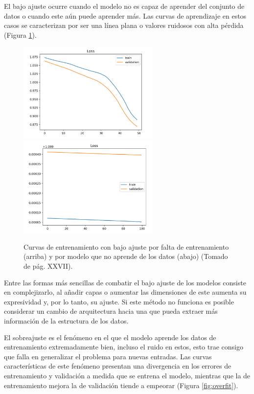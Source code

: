 \documentclass[a4paper,11pt,twocolumn,twoside]{article}
\begin{document}
El bajo ajuste ocurre cuando el modelo no es capaz de aprender del conjunto de datos o cuando este aún puede aprender 
más. Las curvas de aprendizaje en estos casos se caracterizan por ser una línea plana o valores ruidosos con alta pérdida
(Figura \ref{fig:underfit}).

\begin{figure}[h]
	\centering
	\includegraphics[width=7cm,clip]{Graphics/underfit_missing_training.png}
	\includegraphics[width=7cm,clip]{Graphics/underfit_not_learning.png}
	\caption{Curvas de entrenamiento con bajo ajuste por falta de entrenamiento (arriba)
		y por modelo que no aprende de los datos (abajo) (Tomado de \cite{brownlee2018better} pág. XXVII).}
	\label{fig:underfit}
\end{figure}

Entre las formas más sencillas de combatir el bajo ajuste de los modelos consiste en complejizarlo, al añadir
capas o aumentar las dimensiones de este aumenta su expresividad y, por lo tanto, su ajuste. Si este método 
no funciona es posible considerar un cambio de arquitectura hacia una que pueda extraer más información de la 
estructura de los datos. 

El sobreajuste es el fenómeno en el que el modelo aprende los datos de entrenamiento extremadamente bien, incluso
el ruido en estos, esto trae consigo que falla en generalizar el problema para nuevas entradas. Las curvas 
características de este fenómeno presentan una divergencia en los errores de entrenamiento y validación a medida
que se entrena el modelo, mientras que la de entrenamiento mejora la de validación tiende a empeorar (Figura \ref{fig:overfit}). 
\end{document}
